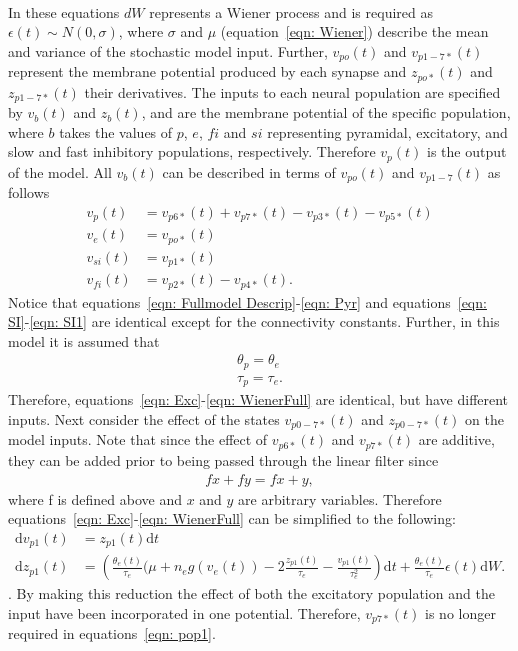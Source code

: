 \begin{align}
\end{align} In these equations $dW$ represents a Wiener process and is required as $\epsilon(t)\sim N(0,\sigma)$, where $\sigma$ and $\mu$ (equation~\ref{eqn: Wiener}) describe the mean and variance of the stochastic model input. Further, $v_{po}(t) $ and $v_{p1-7*}(t)$ represent the membrane potential produced by each synapse and $z_{po*}(t) $ and $z_{p1-7*}(t)$ their derivatives. The inputs to each neural population are specified by $v_{b}(t) $ and $z_{b}(t) $, and are the membrane potential of the specific population, where $b$ takes the values of $p$, $e$, $fi$ and $si$ representing pyramidal, excitatory, and slow and fast inhibitory populations, respectively. Therefore $v_{p}(t) $ is the output of the model. All $v_{b}(t) $ can be described in terms of $v_{po}(t)$ and $v_{p1-7}(t)$ as follows
\begin{align}
\label{eqn: pop1}
v_{p}(t) &= v_{p6*}(t)+v_{p7*}(t)-v_{p3*}(t)-v_{p5*}(t)\\
\label{eqn: pop2}
v_{e}(t) &= v_{po*}(t)\\
\label{eqn: pop3}
v_{si}(t) &= v_{p1*}(t)\\
\label{eqn: pop4}
v_{fi}(t) &= v_{p2*}(t)-v_{p4*}(t).
\end{align} Notice that equations~\ref{eqn: Fullmodel Descrip}-\ref{eqn: Pyr} and equations~\ref{eqn: SI}-\ref{eqn: SI1} are identical except for the connectivity constants. Further, in this model it is assumed that 
\begin{align}
\theta_p = \theta_e\\
\tau_p = \tau_e.
\end{align} Therefore, equations~\ref{eqn: Exc}-\ref{eqn: WienerFull} are identical, but have different inputs. Next consider the effect of the states $v_{p0-7*}(t)$ and $z_{p0-7*}(t)$ on the model inputs. Note that since the effect of $v_{p6*}(t)$ and $v_{p7*}(t)$ are additive, they can be added prior to being passed through the linear filter since
\begin{align}
f{x} + f{y} = f{x+y},
\end{align} where f is defined above and $x$ and $y$ are arbitrary variables. Therefore equations~\ref{eqn: Exc}-\ref{eqn: WienerFull} can be simplified to the following:
\begin{align}
\mathrm{d}v_{p1}(t)&= z_{p1}(t)\mathrm{d}t\\
\label{eqn: Wiener1}
\mathrm{d}z_{p1}(t)&=\left(\frac{\theta_{e}(t)}{\tau_{e}}(\mu +n_{e}g(v_{e}(t))-2\frac{z_{p1}(t)}{\tau_{e}}-\frac{v_{p1}(t)}{\tau_{e}^{2}}\right)\mathrm{d}t + \frac{\theta_{e}(t)}{\tau_{e}}\epsilon(t)\mathrm{d}W.
\end{align}. By making this reduction the effect of both the excitatory population and the input have been incorporated in one potential. Therefore, $v_{p7*}(t)$ is no longer required in equations~\ref{eqn: pop1}. 

